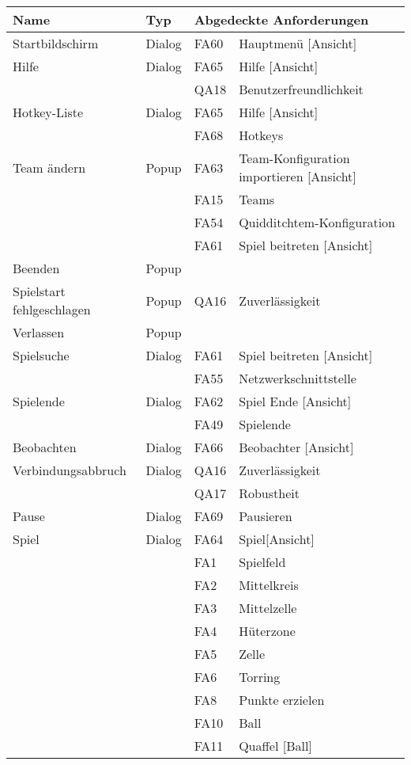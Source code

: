 

\begin{tabular}{| l l l l |}
	\hline
	\textbf{Name} & \textbf{Typ} & \multicolumn{2}{l|}{\textbf{Abgedeckte Anforderungen}} \\\hline
	Startbildschirm & Dialog & FA60 & Hauptmenü [Ansicht]\\\hline
	Hilfe & Dialog & FA65 & Hilfe [Ansicht]\\
	& & QA18 & Benutzerfreundlichkeit\\\hline
	Hotkey-Liste & Dialog & FA65 & Hilfe [Ansicht]\\
	& & FA68 & Hotkeys\\\hline
	Team ändern & Popup & FA63 & Team-Konfiguration importieren [Ansicht]\\
	& & FA15 & Teams\\
	& & FA54 & Quidditchtem-Konfiguration\\
	& & FA61 & Spiel beitreten [Ansicht]\\\hline
	Beenden & Popup & & \\\hline
	Spielstart fehlgeschlagen & Popup & QA16 & Zuverlässigkeit\\\hline
	Verlassen & Popup & &\\\hline
	Spielsuche & Dialog & FA61 & Spiel beitreten [Ansicht]\\
	& & FA55 & Netzwerkschnittstelle\\\hline
	Spielende & Dialog & FA62 & Spiel Ende [Ansicht]\\
	& & FA49 & Spielende\\\hline
	Beobachten & Dialog & FA66 & Beobachter [Ansicht]\\\hline
	Verbindungsabbruch & Dialog & QA16 & Zuverlässigkeit\\
	& & QA17 & Robustheit\\\hline
	Pause & Dialog & FA69 & Pausieren\\\hline
	Spiel & Dialog & FA64 & Spiel[Ansicht]\\
	& & FA1 & Spielfeld\\
	& & FA2 & Mittelkreis\\
	& & FA3 & Mittelzelle\\
	& & FA4 & Hüterzone\\
	& & FA5 & Zelle\\
	& & FA6 & Torring\\
	& & FA8 & Punkte erzielen\\
	& & FA10 & Ball\\
	& & FA11 & Quaffel [Ball]\\

\end{tabular}
